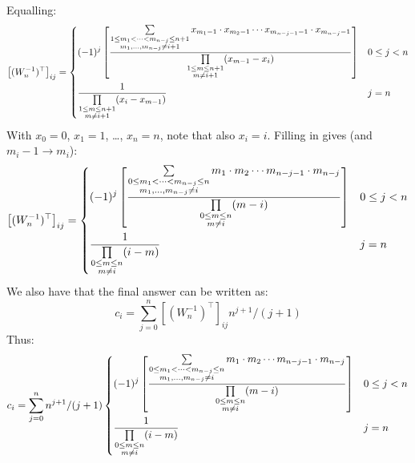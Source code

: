 \documentclass{book}
\begin{document}
\clearpage
Equalling:
\begin{equation}
    \left[(W_n^{-1})^\top\right]_{ij} = \begin{dcases}
        (-1)^{j} \left[ \frac{\sum\limits_{\substack{1\leq m_1 < \dots < m_{n-j} \leq n+1 \\ m_1, \dots, m_{n-j} \neq i+1}} x_{m_1-1} \cdot x_{m_2-1} \cdots x_{m_{n-j-1}-1} \cdot x_{m_{n-j}-1}}{\prod\limits_{\substack{1\leq m \leq n+1 \\ m \neq i+1}} (x_{m-1} - x_{i})} \right] & 0 \leq j < n \\
        \frac{1}{\prod\limits_{\substack{1\leq m \leq n+1 \\ m \neq i+1}} (x_{i} - x_{m-1})} & j = n
    \end{dcases} \nonumber
\end{equation}
With $x_0 = 0$, $x_1 = 1$, \dots, $x_n = n$, note that also $x_i = i$.
Filling in gives (and $m_{i}-1 \to m_{i}$):
\begin{equation}
    \left[(W_n^{-1})^\top\right]_{ij} = \begin{dcases}
        (-1)^{j} \left[ \frac{\sum\limits_{\substack{0\leq m_1 < \dots < m_{n-j} \leq n \\ m_1, \dots, m_{n-j} \neq i}} m_1 \cdot m_2 \cdots m_{n-j-1} \cdot m_{n-j}}{\prod\limits_{\substack{0\leq m \leq n \\ m \neq i}} (m - i)} \right] & 0 \leq j < n \\
        \frac{1}{\prod\limits_{\substack{0\leq m \leq n \\ m \neq i}} (i - m)} & j = n
    \end{dcases} \nonumber
\end{equation}
We also have that the final answer can be written as:
\begin{equation}
    c_i = \sum_{j=0}^{n} \left[(W_n^{-1})^\top\right]_{ij} n^{j+1}/(j+1) \nonumber
\end{equation}
Thus:
\begin{equation}
    c_i = \sum_{j=0}^{n} n^{j+1}/(j+1) \begin{dcases}
        (-1)^{j} \left[ \frac{\sum\limits_{\substack{0\leq m_1 < \dots < m_{n-j} \leq n \\ m_1, \dots, m_{n-j} \neq i}} m_1 \cdot m_2 \cdots m_{n-j-1} \cdot m_{n-j}}{\prod\limits_{\substack{0\leq m \leq n \\ m \neq i}} (m - i)} \right] & 0 \leq j < n \\
        \frac{1}{\prod\limits_{\substack{0\leq m \leq n \\ m \neq i}} (i - m)} & j = n
    \end{dcases} \nonumber
\end{equation}
\end{document}

